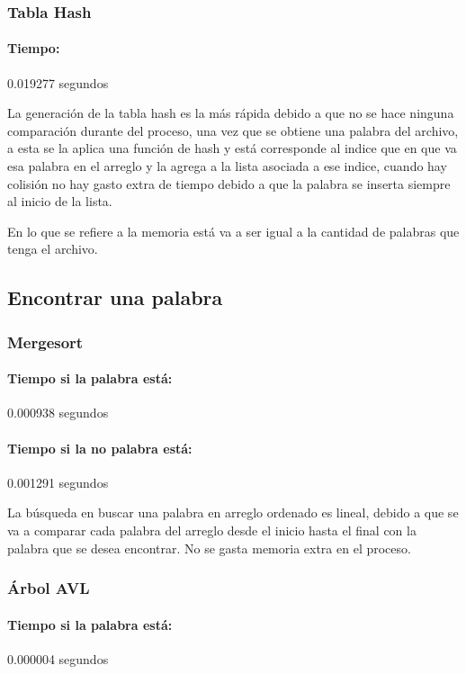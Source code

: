 \documentclass[12pt,letterpaper]{scrartcl}
\begin{document}
\subsubsection{Tabla Hash}

\paragraph{Tiempo:} 0.019277 segundos

La generación de la tabla hash es la más rápida debido a que no se hace ninguna comparación durante del proceso, una vez que se obtiene una palabra del archivo, a esta se la aplica una función de hash y está corresponde al indice que en que va esa palabra en el arreglo y la agrega a la lista asociada a ese indice, cuando hay colisión no hay gasto extra de tiempo debido a que la palabra se inserta siempre al inicio de la lista.

En lo que se refiere a la memoria está va a ser igual a la cantidad de palabras que tenga el archivo.

\subsection{Encontrar una palabra}

\subsubsection{Mergesort}

\paragraph{Tiempo si la palabra está:} 0.000938 segundos

\paragraph{Tiempo si la no palabra está:} 0.001291 segundos

La búsqueda en buscar una palabra en arreglo ordenado es lineal, debido a que se va a comparar cada palabra del arreglo desde el inicio hasta el final con la palabra que se desea encontrar. No se gasta memoria extra en el proceso.

\subsubsection{Árbol AVL}

\paragraph{Tiempo si la palabra está:} 0.000004 segundos
\end{document}

